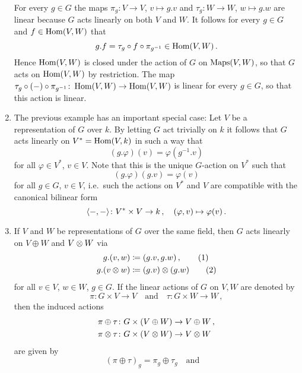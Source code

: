 \begin{example}
\begin{enumerate}
      For every $g \in G$ the maps $\pi_g \colon V \to V$, $v \mapsto g.v$ and $\tau_g \colon W \to W$, $w \mapsto g.w$ are linear because $G$ acts linearly on both $V$ and $W$.
      It follows for every $g \in G$ and $f \in \operatorname{Hom}(V,W)$ that
      \[
            g.f
        =   \tau_g \circ f \circ \pi_{g^{-1}}
        \in \operatorname{Hom}(V,W) \,.
      \]
      Hence $\operatorname{Hom}(V,W)$ is closed under the action of $G$ on $\operatorname{Maps}(V,W)$, so that $G$ acts on $\operatorname{Hom}(V,W)$ by restriction.
      The map $\tau_g \circ (-) \circ \pi_{g^{-1}} \colon \operatorname{Hom}(V,W) \to \operatorname{Hom}(V,W)$ is linear for every $g \in G$, so that this action is linear.
    \item
      The previous example has an important special case:
      Let $V$ be a representation of $G$ over $k$.
      By letting $G$ act trivially on $k$ it follows that $G$ acts linearly on $V^* = \operatorname{Hom}(V,k)$ in such a way that
      \[
          (g.\varphi)(v)
        = \varphi( g^{-1}.v )
      \]
      for all $\varphi \in V^*$, $v \in V$.
      Note that this is the unique $G$-action on $V^*$ such that
      \[
          (g.\varphi)(g.v)
        = \varphi(v)
      \]
      for all $g \in G$, $v \in V$, i.e.\ such the actions on $V^*$ and $V$ are compatible with the canonical bilinear form
      \[
                \langle -,- \rangle
        \colon  V^* \times V
        \to     k \,,
        \quad   (\varphi, v)
        \mapsto \varphi(v) \,.
      \]
    \item
      If $V$ and $W$ be representations of $G$ over the same field, then $G$ acts linearly on $V \oplus W$ and $V \mathbin{\otimes} W$ via
      \begin{align*}
                  g.(v,w)
        &\coloneqq (g.v,g.w) \,,       \tag{1}
        \\
                  g.(v \mathbin{\otimes} w)
        &\coloneqq (g.v) \mathbin{\otimes} (g.w) \tag{2}
      \end{align*}
      for all $v \in V$, $w \in W$, $g \in G$.
      If the linear actions of $G$ on $V, W$ are denoted by
      \[
        \pi \colon G \times V \to V
        \quad\text{and}\quad
        \tau \colon G \times W \to W \,,
      \]
      then the induced actions
      \begin{align*}
        \pi \oplus \tau  \colon G \times (V \oplus W)  &\to V \oplus W  \,,
        \\
        \pi \mathbin{\otimes} \tau \colon G \times (V \mathbin{\otimes} W) &\to V \mathbin{\otimes} W
      \end{align*}
      are given by
      \[
          (\pi \oplus \tau)_g
        = \pi_g \oplus \tau_g
        \quad\text{and}\quad
\]
\end{enumerate}
\end{example}
